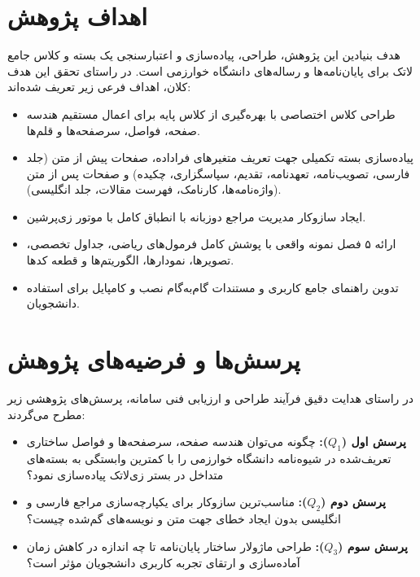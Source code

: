 \section{اهداف پژوهش}
\label{sec:ch1_objectives}

هدف بنیادین این پژوهش، طراحی، پیاده‌سازی و اعتبارسنجی یک بسته و کلاس جامع لاتک برای پایان‌نامه‌ها و رساله‌های دانشگاه خوارزمی است. در راستای تحقق این هدف کلان، اهداف فرعی زیر تعریف شده‌اند:
\begin{itemize}
  \item طراحی کلاس اختصاصی  با بهره‌گیری از کلاس پایه  برای اعمال مستقیم هندسه صفحه، فواصل، سرصفحه‌ها و قلم‌ها.
  \item پیاده‌سازی بسته تکمیلی  جهت تعریف متغیرهای فراداده، صفحات پیش از متن (جلد فارسی، تصویب‌نامه، تعهدنامه، تقدیم، سپاسگزاری، چکیده) و صفحات پس از متن (واژه‌نامه‌ها، کارنامک، فهرست مقالات، جلد انگلیسی).
  \item ایجاد سازوکار مدیریت مراجع دوزبانه با انطباق کامل با موتور زی‌پرشین.
  \item ارائه ۵ فصل نمونه واقعی با پوشش کامل فرمول‌های ریاضی، جداول تخصصی، تصویرها، نمودارها، الگوریتم‌ها و قطعه کدها.
  \item تدوین راهنمای جامع کاربری و مستندات گام‌به‌گام نصب و کامپایل برای استفاده دانشجویان.
\end{itemize}

\section{پرسش‌ها و فرضیه‌های پژوهش}
\label{sec:ch1_questions}

در راستای هدایت دقیق فرآیند طراحی و ارزیابی فنی سامانه، پرسش‌های پژوهشی زیر مطرح می‌گردند:
\begin{itemize}
  \item \textbf{پرسش اول ($Q_1$):} چگونه می‌توان هندسه صفحه، سرصفحه‌ها و فواصل ساختاری تعریف‌شده در شیوه‌نامه دانشگاه خوارزمی را با کمترین وابستگی به بسته‌های متداخل در بستر زی‌لاتک پیاده‌سازی نمود؟
  \item \textbf{پرسش دوم ($Q_2$):} مناسب‌ترین سازوکار برای یکپارچه‌سازی مراجع فارسی و انگلیسی بدون ایجاد خطای جهت متن و نویسه‌های گم‌شده چیست؟
  \item \textbf{پرسش سوم ($Q_3$):} طراحی ماژولار ساختار پایان‌نامه تا چه اندازه در کاهش زمان آماده‌سازی و ارتقای تجربه کاربری دانشجویان مؤثر است؟
\end{itemize}

